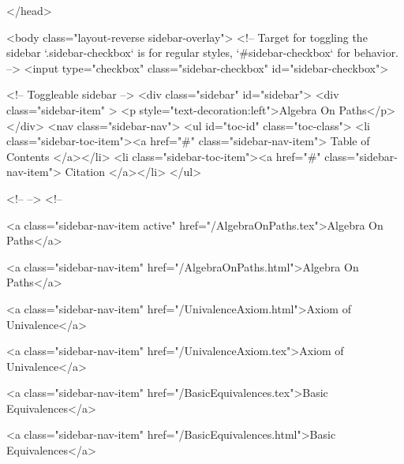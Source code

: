   
</head>




  <body class="layout-reverse sidebar-overlay">
    <!-- Target for toggling the sidebar `.sidebar-checkbox` is for regular
     styles, `#sidebar-checkbox` for behavior. -->
<input type="checkbox" class="sidebar-checkbox" id="sidebar-checkbox">

<!-- Toggleable sidebar -->
<div class="sidebar" id="sidebar">
  <div class="sidebar-item" >
    <p style="text-decoration:left">Algebra On Paths</p>
  </div>
  <nav class="sidebar-nav">
    <ul id="toc-id" class="toc-class">
  <li class="sidebar-toc-item"><a href="#" class="sidebar-nav-item"> Table of Contents </a></li>
  <li class="sidebar-toc-item"><a href="#" class="sidebar-nav-item"> Citation </a></li>
</ul>


    <!--  -->
    <!-- 
      
    
      
    
      
    
      
    
      
        
      
    
      
        
          <a class="sidebar-nav-item active" href="/AlgebraOnPaths.tex">Algebra On Paths</a>
        
      
    
      
        
          <a class="sidebar-nav-item" href="/AlgebraOnPaths.html">Algebra On Paths</a>
        
      
    
      
        
          <a class="sidebar-nav-item" href="/UnivalenceAxiom.html">Axiom of Univalence</a>
        
      
    
      
        
          <a class="sidebar-nav-item" href="/UnivalenceAxiom.tex">Axiom of Univalence</a>
        
      
    
      
        
          <a class="sidebar-nav-item" href="/BasicEquivalences.tex">Basic Equivalences</a>
        
      
    
      
        
          <a class="sidebar-nav-item" href="/BasicEquivalences.html">Basic Equivalences</a>
        
